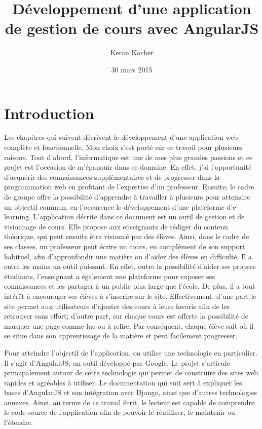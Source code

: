 \documentclass[a4paper,10pt,twoside]{sphinxmanual}
\title{Développement d'une application de gestion de cours avec AngularJS}
\date{30 mars 2015}
\author{Keran Kocher}
\begin{document}
\maketitle
\tableofcontents
{}\label{index::doc}



\chapter{Introduction}
\label{introduction:developpement-d-une-application-de-gestions-de-cours-avec-angularjs}\label{introduction::doc}\label{introduction:introduction}\setcounter{page}{3}
Les chapitres qui suivent décrivent le développement d'une application web complète et fonctionnelle. Mon choix s'est porté sur ce travail pour plusieurs raisons. Tout d'abord, l'informatique est une de mes plus grandes passions et ce projet est l'occasion de m'épanouir dans ce domaine. En effet, j'ai l'opportunité d'acquérir des connaissances supplémentaires et de progresser dans la programmation web en profitant de l'expertise d'un professeur. Ensuite, le cadre de groupe offre la possibilité d'apprendre à travailler à plusieurs pour atteindre un objectif commun, en l'occurence le développement d'une plateforme d'e-learning. L'application décrite dans ce document est un outil de gestion et de visionnage de cours. Elle propose aux enseignants de rédiger du contenu théorique, qui peut ensuite être visionné par des élèves. Ainsi, dans le cadre de ses classes, un professeur peut écrire un cours, en complément de son support habituel, afin d'appronfondir une matière ou d'aider des élèves en difficulté. Il a entre les mains un outil puissant. En effet, outre la possibilité d'aider ses propres étudiants, l'enseignant a également une plateforme pour exposer ses connaissances et les partager à un public plus large que l'école. De plus, il a tout intérêt à encourager ses élèves à s'inscrire sur le site. Effectivement, d'une part le site permet aux utilisateurs d'ajouter des cours à leurs favoris afin de les retrouver sans effort; d'autre part, sur chaque cours est offerte la possibilité de marquer une page comme lue ou à relire. Par conséquent, chaque élève sait où il se situe dans son apprentissage de la matière et peut facilement progresser.

Pour atteindre l'objectif de l'application, on utilise une technologie en particulier. Il s'agit d'AngularJS, un outil développé par Google. Le projet s'articule principalement autour de cette technologie qui permet de construire des sites web rapides et agréables à utiliser. Le documentation qui suit sert à expliquer les bases d'AngularJS et son intégration avec Django, ainsi que d'autres technologies annexes. Ainsi, au terme de ce travail écrit, le lecteur est capable de comprendre le code source de l'application afin de pouvoir le réutiliser, le maintenir ou l'étendre.
\end{document}
